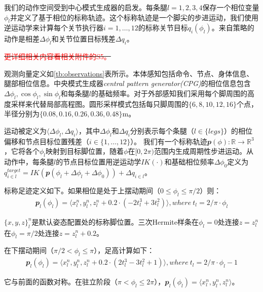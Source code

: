   我们的动作空间受到中心模式生成器的启发\cite[p]{Lee_Hwangbo_Wellhausen_Koltun_Hutter_2020}。每条腿$l={1,2,3,4}$保存一个相位变量$\phi_l$并定义了基于相位的标称轨迹。这个标称轨迹是一个脚尖的步进运动，我们使用逆运动学来计算每个关节执行器$i={1, \dots, 12}$的标称关节目标$q_i(\phi_l)$。来自策略的动作是相差$\Delta \phi_l$和关节位置目标残差$\Delta q_i$。
  
  \sout{\textcolor{red}{\small 更详细相关内容看相关附件的S5。}}
  
  观测向量定义如\ref{tb:observations}表所示。本体感知包括命令、节点、身体信息、腿部相位信息。中央模式生成器\emph{central pattern generator(CPG)}的相位信息包含$\Delta\phi_l, \cos\phi_l, \sin\phi_l$和每条腿$l$的基础频率。对于外部感知我们采用每个脚周围的高度采样来代替局部高程图。圆形采样模式包括每只脚周围的$\{6, 8, 10, 12, 16\}$个点，半径分别为$\{0.08, 0.16, 0.26, 0.36, 0.48\}$m。
  
  运动被定义为$\langle \Delta \phi_l, \Delta q_i \rangle$，其中$\Delta \phi_l$和$\Delta q_i$分别表示每个条腿（$l\in\{legs\}$）的相位偏移和节点目标位置残差（$i\in \{1, \dots, 12\}$）。
  我们有一个标称轨迹$\mathbfit{p}(\phi):\mathbb{R}\longrightarrow\mathbb{R}^3$，它将各个$\phi_l$映射到目标脚位置，随着$\phi$在$[0,2\pi)$范围内生成周期性步进运动。从动作中，每条腿$l$的节点目标位置用逆运动学$IK(\cdot)$和基础相位频率$\Delta\phi_0$定义为$q_{i\in l}^{target}=IK(\mathbfit{p}(\phi_l+\Delta \phi_l + \Delta \phi_0))+\Delta q_{i\in l}$。
  
  标称足迹定义如下。如果相位是处于上摆动期间（$0\leq\phi_l\leq \pi/2$）则：
  \begin{align}
    \mathbfit{p}_l(\phi_l)=\langle x_l^n, y_l^n, z_l^n + 0.2\cdot(-2t_l^3+3t_l^2)\rangle, where\ t_l=2/\pi\cdot\phi_l
  \end{align}
  
  $\{x,y,z\}_l^n$是默认姿态配置处的标称脚位置。三次Hermite样条在$\phi_l=0$处连接$z=z_l^n$在$\phi_l=\pi/2$处连接$z=z_l^n+0.2$。
  
  在下摆动期间（$\pi/2 < \phi_l \leq \pi$），足高计算如下：
  \begin{align}
    \mathbfit{p}_l(\phi_l)=\langle x_l^n, y_l^n, z_l^n + 0.2\cdot(2t_l^3-3t_l^2+1)\rangle, where\ t_l=2/\pi\cdot\phi_l-1
  \end{align}
  
  它与前面的函数对称。在驻立阶段（$\pi< \phi_l \leq 2\pi$），$\mathbfit{p}_l(\phi_l)=\langle x_l^n, y_l^n, z_l^n \rangle$。
  
  
  
